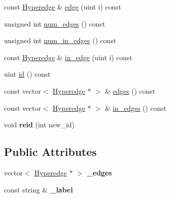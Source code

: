 \begin{DoxyCompactItemize}
\item 
const \hyperlink{class_scarab_1_1_h_g_1_1_hyperedge}{Hyperedge} \& \hyperlink{class_scarab_1_1_h_g_1_1_hypernode_impl_a328189f28a4185d435035686a27592c2}{edge} (uint i) const 
\item 
unsigned int \hyperlink{class_scarab_1_1_h_g_1_1_hypernode_impl_a7fed4809706319cc916ed4c04a641436}{num\_\-edges} () const 
\item 
unsigned int \hyperlink{class_scarab_1_1_h_g_1_1_hypernode_impl_a9a13a37fcece16603ec4bf3f364e6fcc}{num\_\-in\_\-edges} () const 
\item 
const \hyperlink{class_scarab_1_1_h_g_1_1_hyperedge}{Hyperedge} \& \hyperlink{class_scarab_1_1_h_g_1_1_hypernode_impl_a26ff9db30c03c7b74181e9f901aa71d4}{in\_\-edge} (uint i) const 
\item 
uint \hyperlink{class_scarab_1_1_h_g_1_1_hypernode_impl_a2579ef1e67ad8f51d23838c130440d21}{id} () const 
\item 
const vector$<$ \hyperlink{class_scarab_1_1_h_g_1_1_hyperedge}{Hyperedge} $\ast$ $>$ \& \hyperlink{class_scarab_1_1_h_g_1_1_hypernode_impl_ada979dcddc1bf0abf0fc2530d1ea8761}{edges} () const 
\item 
const vector$<$ \hyperlink{class_scarab_1_1_h_g_1_1_hyperedge}{Hyperedge} $\ast$ $>$ \& \hyperlink{class_scarab_1_1_h_g_1_1_hypernode_impl_a77fe0de2e3927be6145cb8fc018088c9}{in\_\-edges} () const 
\item 
\hypertarget{class_scarab_1_1_h_g_1_1_hypernode_impl_a9b0df10dfd6c20c094a928f1ced76f90}{
void {\bfseries reid} (int new\_\-id)}
\label{class_scarab_1_1_h_g_1_1_hypernode_impl_a9b0df10dfd6c20c094a928f1ced76f90}

\end{DoxyCompactItemize}
\subsection*{Public Attributes}
\begin{DoxyCompactItemize}
\item 
\hypertarget{class_scarab_1_1_h_g_1_1_hypernode_impl_aaa189784dcf714f3c1ca54ea8cd0dc83}{
vector$<$ \hyperlink{class_scarab_1_1_h_g_1_1_hyperedge}{Hyperedge} $\ast$ $>$ {\bfseries \_\-edges}}
\label{class_scarab_1_1_h_g_1_1_hypernode_impl_aaa189784dcf714f3c1ca54ea8cd0dc83}

\item 
\hypertarget{class_scarab_1_1_h_g_1_1_hypernode_impl_aefb3b14843d6fb8ed2284ae0d6a53dbd}{
const string \& {\bfseries \_\-label}}
\label{class_scarab_1_1_h_g_1_1_hypernode_impl_aefb3b14843d6fb8ed2284ae0d6a53dbd}

\end{DoxyCompactItemize}


